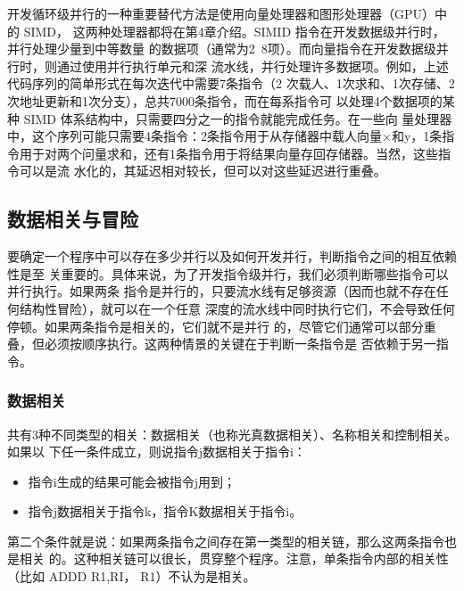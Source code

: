 开发循环级并行的一种重要替代方法是使用向量处理器和图形处理器（GPU）中的 SIMD，
这两种处理器都将在第4章介绍。SIMID 指令在开发数据级并行时，并行处理少量到中等数量
的数据项（通常为2~8项）。而向量指令在开发数据级并行时，则通过使用并行执行单元和深
流水线，并行处理许多数据项。例如，上述代码序列的简单形式在每次迭代中需要7条指令（2
次载人、1次求和、1次存储、2次地址更新和1次分支），总共7000条指令，而在每系指令可
以处理4个数据项的某种 SIMD 体系结构中，只需要四分之一的指令就能完成任务。在一些向
量处理器中，这个序列可能只需要4条指令：2条指令用于从存储器中载人向量×和y，1条指
令用于对两个问量求和，还有1条指令用于将结果向量存回存储器。当然，这些指令可以是流
水化的，其延迟相对较长，但可以对这些延迟进行重叠。

\subsection{数据相关与冒险}
要确定一个程序中可以存在多少并行以及如何开发并行，判断指令之间的相互依赖性是至
关重要的。具体来说，为了开发指令级并行，我们必须判断哪些指令可以并行执行。如果两条
指令是并行的，只要流水线有足够资源（因而也就不存在任何结构性冒险），就可以在一个任意
深度的流水线中同时执行它们，不会导致任何停顿。如果两条指令是相关的，它们就不是并行
的，尽管它们通常可以部分重叠，但必须按顺序执行。这两种情景的关键在于判断一条指令是
否依赖于另一指令。

\subsubsection{数据相关}
共有3种不同类型的相关：数据相关（也称光真数据相关）、名称相关和控制相关。如果以
下任一条件成立，则说指令j数据相关于指令i：

\begin{itemize}
    \item 指令i生成的结果可能会被指令j用到；
    \item 指令j数据相关于指令k，指令K数据相关于指令i。
\end{itemize}

第二个条件就是说：如果两条指令之间存在第一类型的相关链，那么这两条指令也是相关
的。这种相关链可以很长，贯穿整个程序。注意，单条指令内部的相关性（比如 ADDD R1,RI，
R1）不认为是相关。

